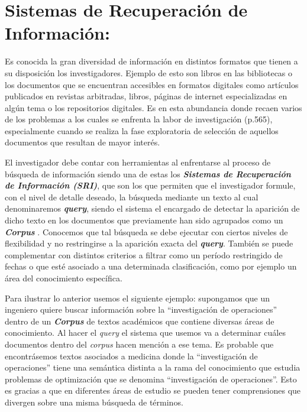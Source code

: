 \documentclass[
  10,
  openany]{book}
\begin{document}
\hypertarget{intro}{%
\section{Sistemas de Recuperación de Información:}\label{intro}}

Es conocida la gran diversidad de información en distintos formatos que tienen a su disposición los investigadores. Ejemplo de esto son libros en las bibliotecas o los documentos que se encuentran accesibles en formatos digitales como artículos publicados en revistas arbitradas, libros, páginas de internet especializadas en algún tema o los repositorios digitales. Es en esta abundancia donde recaen varios de los problemas a los cuales se enfrenta la labor de investigación \citep{hernándezorallo2004} (p.565), especialmente cuando se realiza la fase exploratoria de selección de aquellos documentos que resultan de mayor interés.

El investigador debe contar con herramientas al enfrentarse al proceso de búsqueda de información siendo una de estas los \textbf{\emph{Sistemas de Recuperación de Información (SRI)}}, que son los que permiten que el investigador formule, con el nivel de detalle deseado, la búsqueda mediante un texto al cual denominaremos \textbf{\emph{query}}, siendo el sistema el encargado de detectar la aparición de dicho texto en los documentos que previamente han sido agrupados como un \textbf{\emph{Corpus}} \citep{manning2008}. Conocemos que tal búsqueda se debe ejecutar con ciertos niveles de flexibilidad y no restringirse a la aparición exacta del \textbf{\emph{query}}. También se puede complementar con distintos criterios a filtrar como un período restringido de fechas o que esté asociado a una determinada clasificación, como por ejemplo un área del conocimiento específica.

Para ilustrar lo anterior usemos el siguiente ejemplo: supongamos que un ingeniero quiere buscar información sobre la ``investigación de operaciones'' dentro de un \textbf{\emph{Corpus}} de textos académicos que contiene diversas áreas de conocimiento. Al hacer el \emph{query} el sistema que usemos va a determinar cuáles documentos dentro del \emph{corpus} hacen mención a ese tema. Es probable que encontrásemos textos asociados a medicina donde la ``investigación de operaciones'' tiene una semántica distinta a la rama del conocimiento que estudia problemas de optimización que se denomina ``investigación de operaciones''. Esto es gracias a que en diferentes áreas de estudio se pueden tener comprensiones que divergen sobre una misma búsqueda de términos.
\end{document}
